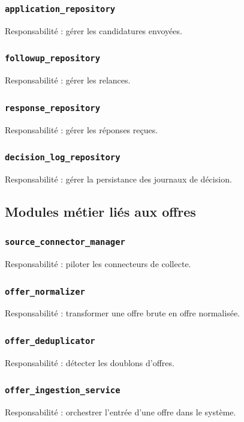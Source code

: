 \documentclass[11pt,a4paper]{article}
\begin{document}
\subsubsection{\texttt{application\_repository}}
Responsabilité : gérer les candidatures envoyées.

\subsubsection{\texttt{followup\_repository}}
Responsabilité : gérer les relances.

\subsubsection{\texttt{response\_repository}}
Responsabilité : gérer les réponses reçues.

\subsubsection{\texttt{decision\_log\_repository}}
Responsabilité : gérer la persistance des journaux de décision.

\subsection{Modules métier liés aux offres}

\subsubsection{\texttt{source\_connector\_manager}}
Responsabilité : piloter les connecteurs de collecte.

\subsubsection{\texttt{offer\_normalizer}}
Responsabilité : transformer une offre brute en offre normalisée.

\subsubsection{\texttt{offer\_deduplicator}}
Responsabilité : détecter les doublons d’offres.

\subsubsection{\texttt{offer\_ingestion\_service}}
Responsabilité : orchestrer l’entrée d’une offre dans le système.
\end{document}
